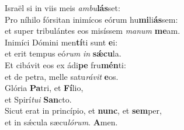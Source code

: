 \evenverse Israël si in viis meis \textit{am}\textit{bu}\textbf{lás}set:\\
\oddverse Pro níhilo fórsitan inimícos eórum hu\textbf{mi}li\textbf{ás}sem:~\*\\
\oddverse et super tribulántes eos misíssem \textit{ma}\textit{num} \textbf{me}am.\\
\evenverse Inimíci Dómini men\textbf{tí}ti sunt \textbf{e}i:~\*\\
\evenverse et erit tempus eó\textit{rum} \textit{in} \textbf{sǽ}\textbf{cu}la.\\
\oddverse Et cibávit eos ex ádi\textbf{pe} fru\textbf{mén}ti:~\*\\
\oddverse et de petra, melle satu\textit{rá}\textit{vit} \textbf{e}os.\\
\evenverse Glória \textbf{Pa}tri, et \textbf{Fí}lio,~\*\\
\evenverse et Spirí\textit{tu}\textit{i} \textbf{San}cto.\\
\oddverse Sicut erat in princípio, et \textbf{nunc}, et \textbf{sem}per,~\*\\
\oddverse et in sǽcula sæcu\textit{ló}\textit{rum}. \textbf{A}men.\\
